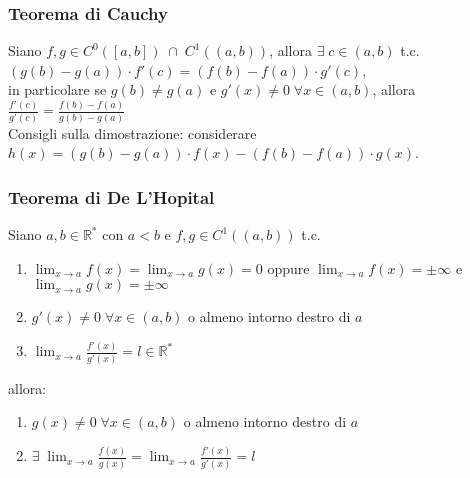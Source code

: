 \documentclass[a4paper]{article}
\newcommand\cont[2]{C^{#1} \left({#2}\right)}
\begin{document}
\subsubsection*{Teorema di Cauchy}
Siano \(f, g \in \cont{0}{\left[a, b\right]} \; \cap \; \cont{1}{\left(a, b\right)}\), allora \(\exists \; c \in \left(a, b\right)\) t.c. \(\left(g(b) - g(a)\right) \cdot f'(c) = \left(f(b) - f(a)\right) \cdot g'(c)\), \\
in particolare se \(g(b) \neq g(a)\) e \(g'(x) \neq 0 \; \forall x \in \left(a, b\right)\), allora \(\displaystyle \frac{f'(c)}{g'(c)} = \frac{f(b) - f(a)}{g(b) - g(a)}\) \\
Consigli sulla dimostrazione: considerare \(h(x) = \left(g(b) - g(a)\right) \cdot f(x) - \left(f(b) - f(a)\right) \cdot g(x)\).

\subsubsection*{Teorema di De L'Hopital}
Siano \(a, b \in \mathbb{R}^*\) con \(a < b\) e \(f, g \in \cont{1}{\left(a, b\right)}\) t.c.
\begin{enumerate} [topsep=3pt, itemsep=0pt]
	\item \(\displaystyle \lim_{x \to a} f(x) = \lim_{x \to a} g(x) = 0\) oppure \(\displaystyle \lim_{x \to a} f(x) = \pm \infty\) e \(\displaystyle \lim_{x \to a} g(x) = \pm \infty\)
	\item \(g'(x) \neq 0 \; \forall x \in \left(a, b\right)\) o almeno intorno destro di \(a\)
	\item \(\displaystyle \lim_{x \to a} \frac{f'(x)}{g'(x)} = l \in \mathbb{R}^*\)
\end{enumerate}
allora:
\begin{enumerate} [topsep=3pt, itemsep=0pt]
	\item \(g(x) \neq 0 \; \forall x \in \left(a, b\right)\) o almeno intorno destro di \(a\)
	\item \(\displaystyle \exists \; \lim_{x \to a} \frac{f(x)}{g(x)} = \lim_{x \to a} \frac{f'(x)}{g'(x)} = l\)
\end{enumerate}
\end{document}
